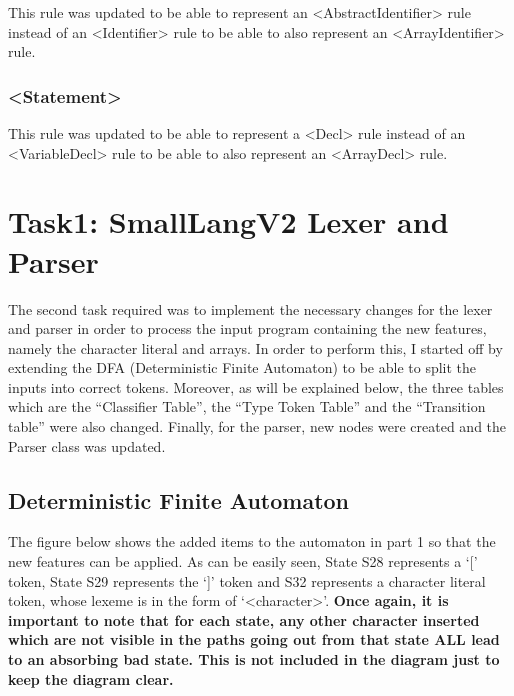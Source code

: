 \documentclass{article}
\newcommand{\quotes}[1]{``#1''}
\begin{document}
				This rule was updated to be able to represent an \textless AbstractIdentifier\textgreater{} rule instead of an \textless Identifier\textgreater{} rule to be able to also represent an \textless ArrayIdentifier\textgreater{} rule.
				
				\subsubsection{\textless Statement\textgreater}
				
				This rule was updated to be able to represent a \textless Decl\textgreater{} rule instead of an \textless VariableDecl\textgreater{} rule to be able to also represent an \textless ArrayDecl\textgreater{} rule.
				
				
				\section{Task1: SmallLangV2 Lexer and Parser}
				
				The second task required was to implement the necessary changes for the lexer and parser in order to process the input program containing the new features, namely the character literal and arrays. In order to perform this, I started off by extending the DFA (Deterministic Finite Automaton) to be able to split the inputs into correct tokens. Moreover, as will be explained below, the three tables which are the \quotes{Classifier Table}, the \quotes{Type Token Table} and the \quotes{Transition table} were also changed. Finally, for the parser, new nodes were created and the Parser class was updated. 
				
				\subsection{Deterministic Finite Automaton}
				
				The figure below shows the added items to the automaton in part 1 so that the new features can be applied. As can be easily seen, State S28 represents a `[' token, State S29 represents the `]' token and S32 represents a character literal token, whose lexeme is in the form of `\textless character\textgreater'. \textbf{Once again, it is important to note that for each state, any other character inserted which are not visible in the paths going out from that state ALL lead to an absorbing bad state. This is not included in the diagram just to keep the diagram clear.}
				
\end{document}

